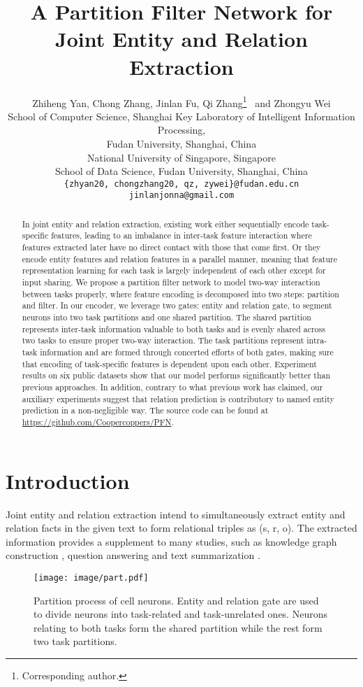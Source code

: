 \documentclass[11pt]{article}
\title{A Partition Filter Network for Joint Entity and Relation Extraction}
\author{Zhiheng Yan, Chong Zhang, Jinlan Fu, Qi Zhang\thanks{  Corresponding author.} \ and Zhongyu Wei \\
         School of Computer Science, Shanghai Key Laboratory of Intelligent Information Processing, \\
         Fudan University, Shanghai, China \\ National University of Singapore, Singapore \\
         School of Data Science, Fudan University, Shanghai, China \\
         \texttt{\{zhyan20, chongzhang20, qz, zywei\}@fudan.edu.cn} \\ 
         \texttt{jinlanjonna@gmail.com}
         }
\begin{document}
\maketitle

\begin{abstract}
In joint entity and relation extraction, existing work either sequentially encode task-specific features, leading to an imbalance in inter-task feature interaction where features extracted later have no direct contact with those that come first. Or they encode entity features and relation features in a parallel manner, meaning that feature representation learning for each task is largely independent of each other except for input sharing. We propose a partition filter network to model two-way interaction between tasks properly, where feature encoding is decomposed into two steps: partition and filter. In our encoder, we leverage two gates: entity and relation gate, to segment neurons into two task partitions and one shared partition. The shared partition represents inter-task information valuable to both tasks and is evenly shared across two tasks to ensure proper two-way interaction. The task partitions represent intra-task information and are formed through concerted efforts of both gates, making sure that encoding of task-specific features is dependent upon each other. Experiment results on six public datasets show that our model performs significantly better than previous approaches. In addition, contrary to what previous work has claimed, our auxiliary experiments suggest that relation prediction is contributory to named entity prediction in a non-negligible way.  The source code can be found at \url{https://github.com/Coopercoppers/PFN}. 

\end{abstract}
 
\section{Introduction}
Joint entity and relation extraction intend to simultaneously extract entity and relation facts in the given text to form relational triples as ({\rm s, r, o}). The extracted information provides a supplement to many studies, such as knowledge graph construction \citep{riedel-etal-2013-relation}, question answering \citep{diefenbach2018core} and text summarization \citep{Gupta2010ASO}. 

\begin{figure}[htbp]
  \vspace{2mm}
  \centering
  \texttt{[image: image/part.pdf]}
  \caption{\label{fig: part} Partition process of cell neurons. Entity and relation gate are used to divide neurons into task-related and task-unrelated ones. Neurons relating to both tasks form the shared partition while the rest form two task partitions. }
  \vspace{-1.5mm}
\end{figure}
\end{document}
